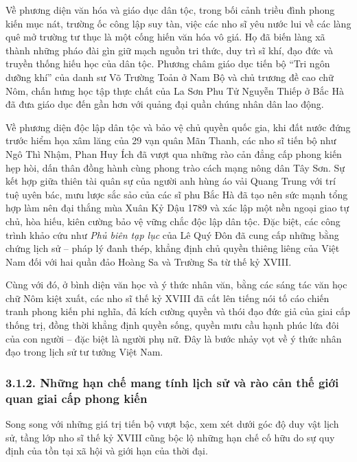 Về phương diện văn hóa và giáo dục dân tộc, trong bối cảnh triều đình phong kiến mục nát, trường ốc công lập suy tàn, việc các nho sĩ yêu nước lui về các làng quê mở trường tư thục là một cống hiến văn hóa vô giá. Họ đã biến làng xã thành những pháo đài gìn giữ mạch nguồn tri thức, duy trì sĩ khí, đạo đức và truyền thống hiếu học của dân tộc. Phương châm giáo dục tiến bộ ``Tri ngôn dưỡng khí'' của danh sư Võ Trường Toản ở Nam Bộ và chủ trương đề cao chữ Nôm, chấn hưng học tập thực chất của La Sơn Phu Tử Nguyễn Thiếp ở Bắc Hà đã đưa giáo dục đến gần hơn với quảng đại quần chúng nhân dân lao động.

Về phương diện độc lập dân tộc và bảo vệ chủ quyền quốc gia, khi đất nước đứng trước hiểm họa xâm lăng của 29 vạn quân Mãn Thanh, các nho sĩ tiến bộ như Ngô Thì Nhậm, Phan Huy Ích đã vượt qua những rào cản đẳng cấp phong kiến hẹp hòi, dấn thân đồng hành cùng phong trào cách mạng nông dân Tây Sơn. Sự kết hợp giữa thiên tài quân sự của người anh hùng áo vải Quang Trung với trí tuệ uyên bác, mưu lược sắc sảo của các sĩ phu Bắc Hà đã tạo nên sức mạnh tổng hợp làm nên đại thắng mùa Xuân Kỷ Dậu 1789 và xác lập một nền ngoại giao tự chủ, hòa hiếu, kiên cường bảo vệ vững chắc độc lập dân tộc. Đặc biệt, các công trình khảo cứu như \textit{Phủ biên tạp lục} của Lê Quý Đôn đã cung cấp những bằng chứng lịch sử -- pháp lý đanh thép, khẳng định chủ quyền thiêng liêng của Việt Nam đối với hai quần đảo Hoàng Sa và Trường Sa từ thế kỷ XVIII.

Cùng với đó, ở bình diện văn học và ý thức nhân văn, bằng các sáng tác văn học chữ Nôm kiệt xuất, các nho sĩ thế kỷ XVIII đã cất lên tiếng nói tố cáo chiến tranh phong kiến phi nghĩa, đả kích cường quyền và thói đạo đức giả của giai cấp thống trị, đồng thời khẳng định quyền sống, quyền mưu cầu hạnh phúc lứa đôi của con người -- đặc biệt là người phụ nữ. Đây là bước nhảy vọt về ý thức nhân đạo trong lịch sử tư tưởng Việt Nam.

\subsubsection*{3.1.2. Những hạn chế mang tính lịch sử và rào cản thế giới quan giai cấp phong kiến}

Song song với những giá trị tiến bộ vượt bậc, xem xét dưới góc độ duy vật lịch sử, tầng lớp nho sĩ thế kỷ XVIII cũng bộc lộ những hạn chế cố hữu do sự quy định của tồn tại xã hội và giới hạn của thời đại.

